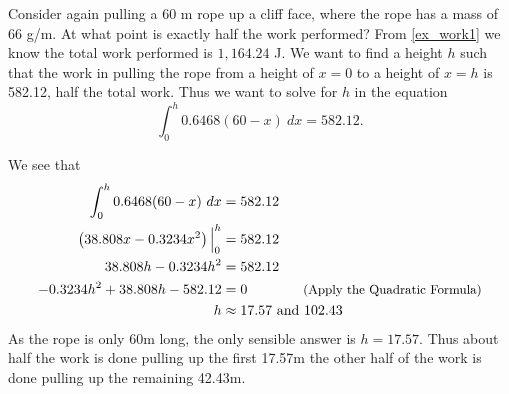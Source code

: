 \begin{example}\label{ex_work1_5}
Consider again pulling a 60 m rope up a cliff face, where the rope has a mass of 66 g/m. At what point is exactly half the work performed?
\solution
From \autoref{ex_work1} we know the total work performed is $1,164.24$ J. We want to find a height $h$ such that the work in pulling the rope from a height of $x=0$ to a height of $x=h$ is 582.12, half the total work. Thus we want to solve for $h$ in the equation
\[\int_0^h 0.6468(60-x)\ dx = 582.12.\]

We see that
\begin{align*}
	\int_0^h 0.6468(60-x)\ dx &= 582.12 \\
	\left(38.808x-0.3234x^2\right)\Big|_0^h &=582.12 \\
	38.808h-0.3234h^2 &=582.12 \\
	-0.3234h^2+38.808h-582.12 &=0 \qquad\qquad\text{\small(Apply the Quadratic Formula)} \\
	h&\approx17.57 \ \text{and}\ 102.43
\end{align*}
As the rope is only 60m long, the only sensible answer is $h=17.57$. Thus about half the work is done pulling up the first 17.57m the other half of the work is done pulling up the remaining 42.43m.
\end{example}

